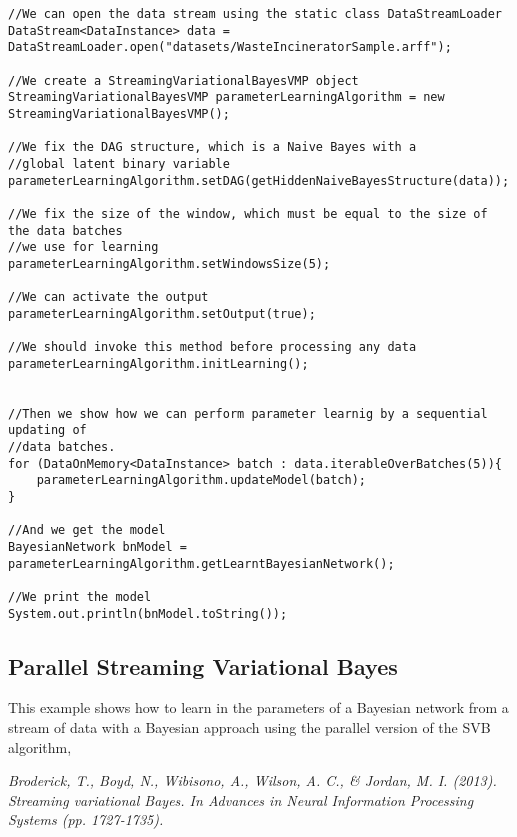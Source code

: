 \begin{lstlisting}
//We can open the data stream using the static class DataStreamLoader
DataStream<DataInstance> data = DataStreamLoader.open("datasets/WasteIncineratorSample.arff");

//We create a StreamingVariationalBayesVMP object
StreamingVariationalBayesVMP parameterLearningAlgorithm = new StreamingVariationalBayesVMP();

//We fix the DAG structure, which is a Naive Bayes with a 
//global latent binary variable
parameterLearningAlgorithm.setDAG(getHiddenNaiveBayesStructure(data));

//We fix the size of the window, which must be equal to the size of the data batches 
//we use for learning
parameterLearningAlgorithm.setWindowsSize(5);

//We can activate the output
parameterLearningAlgorithm.setOutput(true);

//We should invoke this method before processing any data
parameterLearningAlgorithm.initLearning();


//Then we show how we can perform parameter learnig by a sequential updating of 
//data batches.
for (DataOnMemory<DataInstance> batch : data.iterableOverBatches(5)){
    parameterLearningAlgorithm.updateModel(batch);
}

//And we get the model
BayesianNetwork bnModel = parameterLearningAlgorithm.getLearntBayesianNetwork();

//We print the model
System.out.println(bnModel.toString());
\end{lstlisting}


\subsection{Parallel Streaming Variational Bayes}

This example shows how to learn in the parameters of a Bayesian network from a stream of data with a Bayesian
approach using the parallel version  of the SVB algorithm, 

\textit{Broderick, T., Boyd, N., Wibisono, A., Wilson, A. C., \& Jordan, M. I. (2013). Streaming variational Bayes. 
In Advances in Neural Information Processing Systems (pp. 1727-1735).
}


